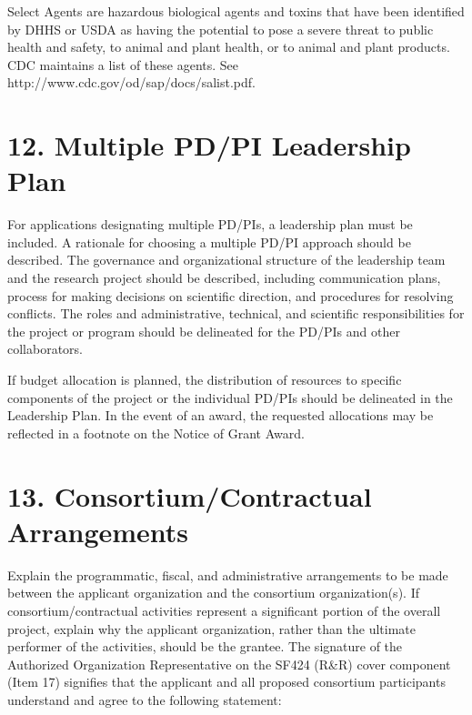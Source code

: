 \documentclass[11pt,notitlepage]{article}
\begin{document}
Select Agents are hazardous biological agents and toxins that have been identified by DHHS or USDA as having the potential to pose a severe threat to public health and safety, to animal and plant health, or to animal and plant products. CDC maintains a list of these agents. See http://www.cdc.gov/od/sap/docs/salist.pdf.


\newpage

\section*{12. Multiple PD/PI Leadership Plan}

For applications designating multiple PD/PIs, a leadership plan must be included. A rationale for choosing a multiple PD/PI approach should be described. The governance and organizational structure of the leadership team and the research project should be described, including communication plans, process for making decisions on scientific direction, and procedures for resolving conflicts. The roles and administrative, technical, and scientific responsibilities for the project or program should be delineated for the PD/PIs and other collaborators.

If budget allocation is planned, the distribution of resources to specific components of the project or the individual PD/PIs should be delineated in the Leadership Plan. In the event of an award, the requested allocations may be reflected in a footnote on the Notice of Grant Award.


\newpage

\section*{13. Consortium/Contractual Arrangements}

Explain the programmatic, fiscal, and administrative arrangements to be made between the applicant organization and the consortium organization(s). If consortium/contractual activities represent a significant portion of the overall project, explain why the applicant organization, rather than the ultimate performer of the activities, should be the grantee. The signature of the Authorized Organization Representative on the SF424 (R\&R) cover component (Item 17) signifies that the applicant and all proposed consortium participants understand and agree to the following statement:
\end{document}
